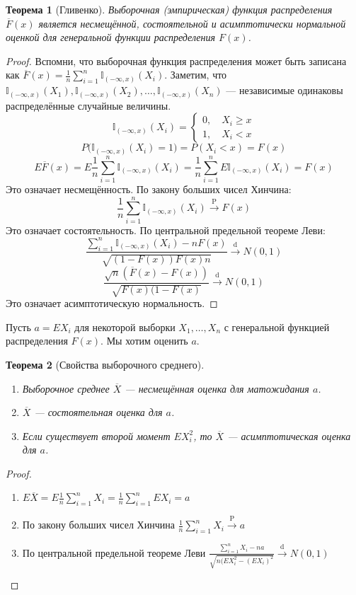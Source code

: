 \documentclass[11pt,openany,a4paper]{scrartcl}
\theoremstyle{plain}
\newtheorem{theorem}{Теорема}[subsection]
\theoremstyle{definition}
\newcommand\mb{\mathbb}
\newcommand{\overto}[1]{\xrightarrow{#1}}
\newcommand{\ol}{\overline}
\begin{document}
\begin{theorem}[Гливенко]
    Выборочная (эмпирическая) функция распределения $\ol F(x)$ является
    несмещённой, состоятельной
    и асимптотически нормальной оценкой для генеральной функции распределения $F(x)$.
\end{theorem}
\begin{proof}
    Вспомни, что выборочная функция распределения может быть записана как
    $\ol F(x) = \frac{1}{n}\sum\limits_{i=1}^n \mb I_{(-\infty, x)} (X_i)$.
    Заметим, что $\mb I_{(-\infty, x)} (X_1), \mb I_{(-\infty, x)} (X_2), \ldots,
    \mb I_{(-\infty, x)} (X_n)$ — независимые одинаковы распределённые случайные величины.
    $$
    \mb I_{(-\infty, x)} (X_i) =
    \begin{cases}
        0,\quad X_i \geqslant x \\
        1,\quad X_i < x
    \end{cases}
    $$
    $$
    P\Big(\mb I_{(-\infty, x)} (X_i) = 1\Big) = P(X_i < x) = F(x)
    $$
    $$
    E\ol F(x) = E\frac{1}{n}\sum\limits_{i=1}^n\mb I_{(-\infty, x)} (X_i) =
    \frac{1}{n}\sum\limits_{i=1}^nE\mb I_{(-\infty, x)} (X_i) = F(x)
    $$
    Это означает несмещённость. По закону больших чисел Хинчина:
    $$
    \frac{1}{n}\sum\limits_{i=1}^n\mb I_{(-\infty, x)} (X_i) \overto{\mathrm P} F(x)
    $$
    Это означает состоятельность. По центральной предельной теореме Леви:
    $$
    \frac{\sum\limits_{i=1}^n \mb I_{(-\infty, x)} (X_i) - nF(x)}{\sqrt{(1 - F(x))F(x)n}}
    \overto{\mathrm d} N(0, 1)
    $$
    $$
    \frac{\sqrt n (\ol F(x) - F(x))}{\sqrt{F(x)(1 - F(x)}} \overto{\mathrm d} N(0, 1)
    $$
    Это означает асимптотическую нормальность.
\end{proof}
    
Пусть $a = EX_i$ для некоторой выборки $X_1, \ldots, X_n$ с генеральной функцией 
распределения $F(x)$. Мы хотим оценить $a$.

\begin{theorem}[Свойства выборочного среднего]
\mbox{}
    \begin{enumerate}
        \item Выборочное среднее $\ol X$ — несмещённая оценка для матожидания $a$.
        \item $\ol X$ — состоятельная оценка для $a$.
        \item Если существует второй момент $EX_i^2$, то $\ol X$ — асимптотическая оценка для
        $a$.
    \end{enumerate}
\end{theorem}
\begin{proof}
\mbox{}
    \begin{enumerate}
        \item $E\ol X = E\frac{1}{n}\sum\limits_{i=1}^n X_i =
        \frac{1}{n} \sum\limits_{i=1}^n EX_i = a$
        \item По закону больших чисел Хинчина
        $\frac{1}{n}\sum\limits_{i=1}^n X_i \overto{\mathrm P} a$
        \item По центральной предельной теореме Леви
        $\frac{\sum\limits_{i=1}^n X_i - na}{\sqrt{n (EX_i^2 - (EX_i)^2}}
        \overto{\mathrm d} N(0, 1)$
    \end{enumerate}
\end{proof}
\end{document}
